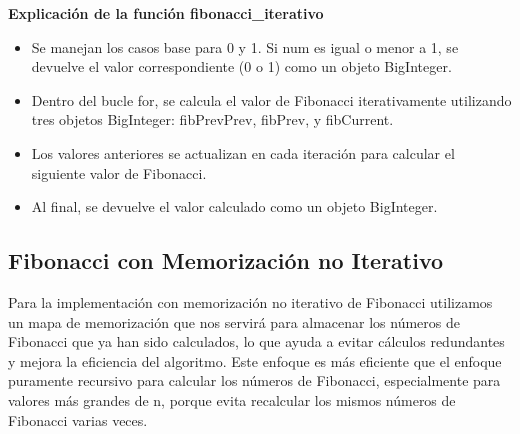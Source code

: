 \documentclass{article}
\begin{document}
            \textbf{Explicación de la función fibonacci\_iterativo}\par  
            \begin{itemize}
                \item {Se manejan los casos base para 0 y 1. Si num es igual o menor a 1, se devuelve el valor correspondiente (0 o 1) como un objeto BigInteger.}
                \item {Dentro del bucle for, se calcula el valor de Fibonacci iterativamente utilizando tres objetos BigInteger: fibPrevPrev, fibPrev, y fibCurrent.}
                \item {Los valores anteriores se actualizan en cada iteración para calcular el siguiente valor de Fibonacci.}
                \item {Al final, se devuelve el valor calculado como un objeto BigInteger.}
            \end{itemize}
        
        \subsection{Fibonacci con Memorización no Iterativo}
            Para la implementación con memorización no iterativo de Fibonacci utilizamos un mapa de memorización que nos servirá para almacenar los números de Fibonacci que ya han sido calculados, lo que ayuda a evitar cálculos redundantes y mejora la eficiencia del algoritmo.            
            Este enfoque es más eficiente que el enfoque puramente recursivo para calcular los números de Fibonacci, especialmente para valores más grandes de n, porque evita recalcular los mismos números de Fibonacci varias veces.

            
\end{document}
